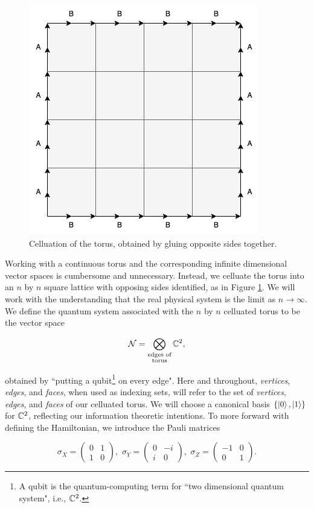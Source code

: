 \documentclass{article}
\theoremstyle{definition}
\numberwithin{figure}{section}
\begin{document}
\begin{figure}
\begin{center}
\includegraphics[scale=0.3]{torus}
\caption{Celluation of the torus, obtained by gluing opposite sides together.}
\label{fig:torus}
\end{center}
\end{figure}

Working with a continuous torus and the corresponding infinite dimensional vector spaces is cumbersome and unnecessary. Instead, we celluate the torus into an $n$ by $n$ square lattice with opposing sides identified, as in Figure \ref{fig:torus}. We will work with the understanding that the real physical system is the limit as $n\to\infty$. We define the quantum system associated with the $n$ by $n$ celluated torus to be the vector space

$$\mathcal{N}=\bigotimes_{\substack{\text{edges of}\\\text{torus}}}\mathbb{C}^2,$$

obtained by ``putting a qubit\footnote{A qubit is the quantum-computing term for ``two dimensional quantum system", i.e., $\mathbb{C}^2$.}
on every edge". Here and throughout, \textit{vertices}, \textit{edges}, and \textit{faces}, when used as indexing sets, will refer to the set of \textit{vertices}, \textit{edges}, and \textit{faces} of our celluated torus. We will choose a canonical basis $\left\{\left|0\right>,\left|1\right>\right\}$ for $\mathbb{C}^2$, reflecting our information theoretic intentions. To more forward with defining the Hamiltonian, we introduce the Pauli matrices

$$
\sigma_X=
\begin{pmatrix}
0 & 1\\
1 & 0
\end{pmatrix},\,\,
\sigma_Y=
\begin{pmatrix}
0 & -i\\
i & 0
\end{pmatrix},\,\,
\sigma_Z=
\begin{pmatrix}
-1 & 0\\
0 & 1
\end{pmatrix}.
$$
\end{document}
